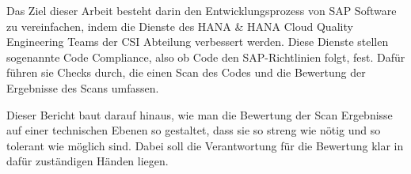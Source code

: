 \documentclass[../main.tex]{subfiles}
\begin{document}
Das Ziel dieser Arbeit besteht darin den Entwicklungsprozess von SAP Software zu vereinfachen, indem die Dienste des HANA \& HANA Cloud Quality Engineering Teams der \gls{CSI} Abteilung verbessert werden.
Diese Dienste stellen sogenannte Code Compliance, also ob Code den SAP-Richtlinien folgt, fest. Dafür führen sie Checks durch, die einen Scan des Codes und die Bewertung der Ergebnisse des Scans umfassen. 

Dieser Bericht baut darauf hinaus, wie man die Bewertung der Scan Ergebnisse auf einer technischen Ebenen so gestaltet, dass sie so streng wie nötig und so tolerant wie möglich sind.
Dabei soll die Verantwortung für die Bewertung klar in dafür zuständigen Händen liegen.
\end{document}

